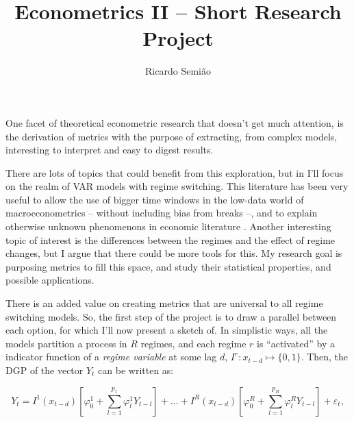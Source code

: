 \documentclass[11pt, a4paper]{article}
\title{Econometrics II -- Short Research Project}
\author{Ricardo Semião}
\begin{document}
\maketitle
\thispagestyle{empty} %

One facet of theoretical econometric research that doesn't get much attention, is the derivation of metrics with the purpose of extracting, from complex models, interesting to interpret and easy to digest results.


There are lots of topics that could benefit from this exploration, but in I'll focus on the realm of VAR models with regime switching. This literature has been very useful to allow the use of bigger time windows in the low-data world of macroeconometrics -- without including bias from breaks --, and to explain otherwise unknown phenomenons in economic literature \supercite{Ferraresi2015}. Another interesting topic  of interest is the differences between the regimes and the effect of regime changes, but I argue that there could be more tools for this. My research goal is purposing metrics to fill this space, and study their statistical properties, and possible applications.

There is an added value on creating metrics that are universal to all regime switching models. So, the first step of the project is to draw a parallel between each option, for which I'll now present a sketch of. In simplistic ways, all the models partition a process in $R$ regimes, and each regime $r$ is ``activated'' by a indicator function of a \textit{regime variable} at some lag $d$, $I^r: x_{t-d} \mapsto \{0, 1\}$. Then, the DGP of the vector $Y_t$ can be written as:

\vspace*{-0.2cm}
$$
Y_t = I^1(x_{t-d}) \left[\varphi^1_0 + \sum_{l=1}^{p_1} \varphi^1_l Y_{t-l}\right] + \dots + I^R(x_{t-d}) \left[\varphi^R_0 + \sum_{l=1}^{p_R} \varphi^R_l Y_{t-l}\right] + \varepsilon_t,
$$
\end{document}
